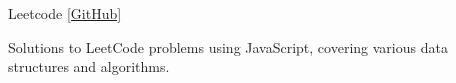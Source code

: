 \begin{cventries}
  \projectentry
    {}
    {Leetcode \href{https://github.com/bookmountain/leetcode}{\footnotesize\color{ao}[GitHub]}} %
{}
{}
    {
      \begin{cvitems} %
        \item {Solutions to LeetCode problems using JavaScript, covering various data structures and algorithms.}
      \end{cvitems}
    }
\end{cventries}